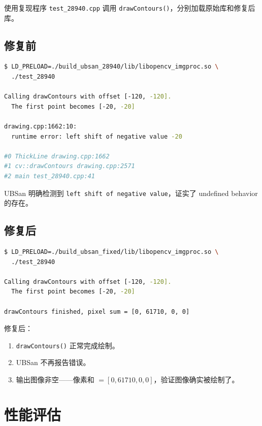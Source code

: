 \documentclass[12pt,a4paper]{article}
\begin{document}
使用复现程序 \texttt{test\_28940.cpp} 调用 \texttt{drawContours()}，分别加载原始库和修复后库。

\subsection{修复前}

\begin{lstlisting}[language=bash]
$ LD_PRELOAD=./build_ubsan_28940/lib/libopencv_imgproc.so \
  ./test_28940

Calling drawContours with offset [-120, -120].
  The first point becomes [-20, -20]

drawing.cpp:1662:10:
  runtime error: left shift of negative value -20

#0 ThickLine drawing.cpp:1662
#1 cv::drawContours drawing.cpp:2571
#2 main test_28940.cpp:41
\end{lstlisting}

UBSan 明确检测到 \texttt{left shift of negative value}，证实了 undefined behavior 的存在。

\subsection{修复后}

\begin{lstlisting}[language=bash]
$ LD_PRELOAD=./build_ubsan_fixed/lib/libopencv_imgproc.so \
  ./test_28940

Calling drawContours with offset [-120, -120].
  The first point becomes [-20, -20]

drawContours finished, pixel sum = [0, 61710, 0, 0]
\end{lstlisting}

修复后：
\begin{enumerate}[leftmargin=*]
    \item \texttt{drawContours()} 正常完成绘制。
    \item UBSan 不再报告错误。
    \item 输出图像非空——像素和 $= [0, 61710, 0, 0]$，验证图像确实被绘制了。
\end{enumerate}

\section{性能评估}
\end{document}
